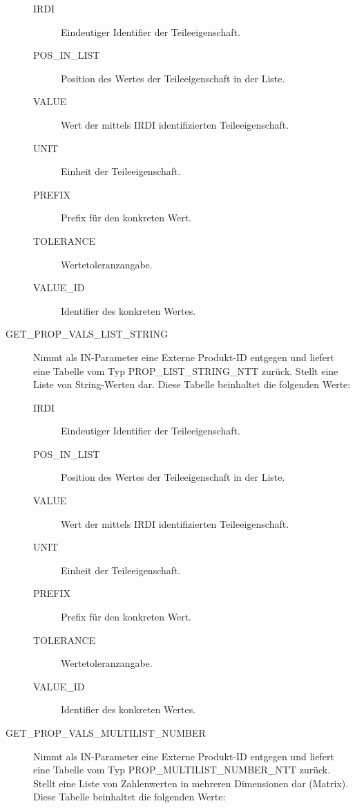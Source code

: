 \begin{description}
  \begin{description}
  \item[IRDI] Eindeutiger Identifier der Teileeigenschaft.
  \item[POS\_IN\_LIST] Position des Wertes der Teileeigenschaft in der Liste.
  \item[VALUE] Wert der mittels IRDI identifizierten Teileeigenschaft.
  \item[UNIT] Einheit der Teileeigenschaft.
  \item[PREFIX] Prefix für den konkreten Wert.
  \item[TOLERANCE] Wertetoleranzangabe.
  \item[VALUE\_ID] Identifier des konkreten Wertes.
  \end{description}
  
\item[GET\_PROP\_VALS\_LIST\_STRING] Nimmt als IN-Parameter eine Externe Produkt-ID entgegen und liefert eine Tabelle vom Typ PROP\_LIST\_STRING\_NTT zurück. Stellt eine Liste von String-Werten dar. 
Diese Tabelle beinhaltet die folgenden Werte: 

  \begin{description}
  \item[IRDI] Eindeutiger Identifier der Teileeigenschaft.
  \item[POS\_IN\_LIST] Position des Wertes der Teileeigenschaft in der Liste.
  \item[VALUE] Wert der mittels IRDI identifizierten Teileeigenschaft.
  \item[UNIT] Einheit der Teileeigenschaft.
  \item[PREFIX] Prefix für den konkreten Wert.
  \item[TOLERANCE] Wertetoleranzangabe.
  \item[VALUE\_ID] Identifier des konkreten Wertes.
  \end{description}
\item[GET\_PROP\_VALS\_MULTILIST\_NUMBER] Nimmt als IN-Parameter eine Externe Produkt-ID entgegen und liefert eine Tabelle vom Typ PROP\_MULTILIST\_NUMBER\_NTT zurück. Stellt eine Liste von Zahlenwerten in mehreren Dimensionen dar (Matrix). 
Diese Tabelle beinhaltet die folgenden Werte: 


\end{description}

